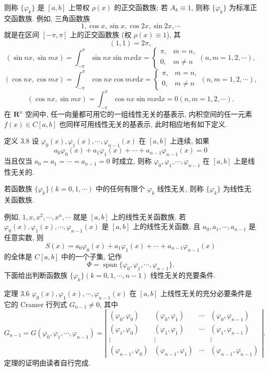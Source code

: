\documentclass[
  10pt,
  fontset=fandol]{ctexart}
\begin{document}
则称 \(\{\varphi_k\}\) 是 \([a,b]\) 上带权 \(\rho(x)\) 的正交函数族; 若 \(A_k \equiv 1\), 则称 \(\{\varphi_k\}\) 为标准正交函数族. 例如, 三角函数族 \[
1, \cos x, \sin x, \cos 2x, \sin 2x, \cdots
\] 就是在区间 \([-\pi, \pi]\) 上的正交函数族 (权 \(\rho(x) \equiv 1\)), 其 \[
(1,1) = 2\pi,
\] \[
(\sin nx, \sin mx) = \int_{-\pi}^{\pi} \sin nx \sin mx \mathrm{d}x = \begin{cases} \pi, & m=n, \\ 0, & m \neq n \end{cases} (n,m=1,2, \cdots),
\] \[
(\cos nx, \cos mx) = \int_{-\pi}^{\pi} \cos nx \cos mx \mathrm{d}x = \begin{cases} \pi, & m=n, \\ 0, & m \neq n \end{cases} (n,m=1,2, \cdots),
\] \[
(\cos nx, \sin mx) = \int_{-\pi}^{\pi} \cos nx \sin mx \mathrm{d}x = 0 (n,m=1,2, \cdots).
\] 在 \(\mathbf{R}^n\) 空间中, 任一向量都可用它的一组线性无关的基表示, 内积空间的任一元素 \(f(x) \in C[a,b]\) 也同样可用线性无关的基表示, 此时相应地有如下定义.

定义 3.8 设 \(\varphi_0(x), \varphi_1(x), \cdots, \varphi_{n-1}(x)\) 在 \([a,b]\) 上连续, 如果 \[
a_0 \varphi_0(x) + a_1 \varphi_1(x) + \cdots + a_{n-1} \varphi_{n-1}(x) = 0
\] 当且仅当 \(a_0 = a_1 = \cdots = a_{n-1} = 0\) 时成立, 则称 \(\varphi_0, \varphi_1, \cdots, \varphi_{n-1}\) 在 \([a,b]\) 上是线性无关的.

若函数族 \(\{\varphi_k\} (k=0,1, \cdots)\) 中的任何有限个 \(\varphi_k\) 线性无关, 则称 \(\{\varphi_k\}\) 为线性无关函数族.

例如, \(1,\allowbreak  x,\allowbreak  x^2,\allowbreak  \cdots,\allowbreak  x^n,\allowbreak  \cdots\) 就是 \([a,b]\) 上的线性无关函数族. 若 \(\varphi_0(x), \varphi_1(x), \cdots, \varphi_{n-1}(x)\) 是 \([a,b]\) 上的线性无关函数, 且 \(a_0, a_1, \cdots, a_{n-1}\) 是任意实数, 则 \[
S(x) = a_0 \varphi_0(x) + a_1 \varphi_1(x) + \cdots + a_{n-1} \varphi_{n-1}(x)
\] 的全体是 \(C[a,b]\) 中的一个子集, 记作 \[
\Phi = \operatorname{span}\{\varphi_0, \varphi_1, \cdots, \varphi_{n-1}\}. \tag{3.3.9}
\] 下面给出判断函数族 \(\{\varphi_k\} (k=0,1, \cdots, n-1)\) 线性无关的充要条件.

定理 3.6 \(\varphi_0(x), \varphi_1(x), \cdots, \varphi_{n-1}(x)\) 在 \([a,b]\) 上线性无关的充分必要条件是它的 Cramer 行列式 \(G_{n-1} \neq 0\), 其中 \[
G_{n-1} = G(\varphi_0, \varphi_1, \cdots, \varphi_{n-1}) = \left| \begin{array}{cccc} (\varphi_0, \varphi_0) & (\varphi_0, \varphi_1) & \cdots & (\varphi_0, \varphi_{n-1}) \\ (\varphi_1, \varphi_0) & (\varphi_1, \varphi_1) & \cdots & (\varphi_1, \varphi_{n-1}) \\ \vdots & \vdots & & \vdots \\ (\varphi_{n-1}, \varphi_0) & (\varphi_{n-1}, \varphi_1) & \cdots & (\varphi_{n-1}, \varphi_{n-1}) \end{array} \right|. \tag{3.3.10}
\] 定理的证明由读者自行完成.
\end{document}
